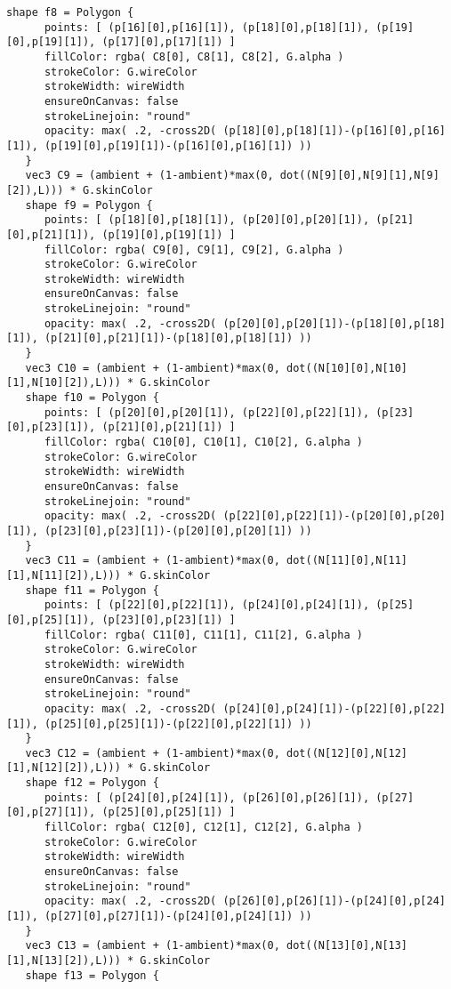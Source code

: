 \begin{lstlisting}[language=Sty-RT,escapechar=@]
   shape f8 = Polygon {
      points: [ (p[16][0],p[16][1]), (p[18][0],p[18][1]), (p[19][0],p[19][1]), (p[17][0],p[17][1]) ]
      fillColor: rgba( C8[0], C8[1], C8[2], G.alpha )
      strokeColor: G.wireColor
      strokeWidth: wireWidth
      ensureOnCanvas: false
      strokeLinejoin: "round"
      opacity: max( .2, -cross2D( (p[18][0],p[18][1])-(p[16][0],p[16][1]), (p[19][0],p[19][1])-(p[16][0],p[16][1]) ))
   }
   vec3 C9 = (ambient + (1-ambient)*max(0, dot((N[9][0],N[9][1],N[9][2]),L))) * G.skinColor
   shape f9 = Polygon {
      points: [ (p[18][0],p[18][1]), (p[20][0],p[20][1]), (p[21][0],p[21][1]), (p[19][0],p[19][1]) ]
      fillColor: rgba( C9[0], C9[1], C9[2], G.alpha )
      strokeColor: G.wireColor
      strokeWidth: wireWidth
      ensureOnCanvas: false
      strokeLinejoin: "round"
      opacity: max( .2, -cross2D( (p[20][0],p[20][1])-(p[18][0],p[18][1]), (p[21][0],p[21][1])-(p[18][0],p[18][1]) ))
   }
   vec3 C10 = (ambient + (1-ambient)*max(0, dot((N[10][0],N[10][1],N[10][2]),L))) * G.skinColor
   shape f10 = Polygon {
      points: [ (p[20][0],p[20][1]), (p[22][0],p[22][1]), (p[23][0],p[23][1]), (p[21][0],p[21][1]) ]
      fillColor: rgba( C10[0], C10[1], C10[2], G.alpha )
      strokeColor: G.wireColor
      strokeWidth: wireWidth
      ensureOnCanvas: false
      strokeLinejoin: "round"
      opacity: max( .2, -cross2D( (p[22][0],p[22][1])-(p[20][0],p[20][1]), (p[23][0],p[23][1])-(p[20][0],p[20][1]) ))
   }
   vec3 C11 = (ambient + (1-ambient)*max(0, dot((N[11][0],N[11][1],N[11][2]),L))) * G.skinColor
   shape f11 = Polygon {
      points: [ (p[22][0],p[22][1]), (p[24][0],p[24][1]), (p[25][0],p[25][1]), (p[23][0],p[23][1]) ]
      fillColor: rgba( C11[0], C11[1], C11[2], G.alpha )
      strokeColor: G.wireColor
      strokeWidth: wireWidth
      ensureOnCanvas: false
      strokeLinejoin: "round"
      opacity: max( .2, -cross2D( (p[24][0],p[24][1])-(p[22][0],p[22][1]), (p[25][0],p[25][1])-(p[22][0],p[22][1]) ))
   }
   vec3 C12 = (ambient + (1-ambient)*max(0, dot((N[12][0],N[12][1],N[12][2]),L))) * G.skinColor
   shape f12 = Polygon {
      points: [ (p[24][0],p[24][1]), (p[26][0],p[26][1]), (p[27][0],p[27][1]), (p[25][0],p[25][1]) ]
      fillColor: rgba( C12[0], C12[1], C12[2], G.alpha )
      strokeColor: G.wireColor
      strokeWidth: wireWidth
      ensureOnCanvas: false
      strokeLinejoin: "round"
      opacity: max( .2, -cross2D( (p[26][0],p[26][1])-(p[24][0],p[24][1]), (p[27][0],p[27][1])-(p[24][0],p[24][1]) ))
   }
   vec3 C13 = (ambient + (1-ambient)*max(0, dot((N[13][0],N[13][1],N[13][2]),L))) * G.skinColor
   shape f13 = Polygon {

\end{lstlisting}
